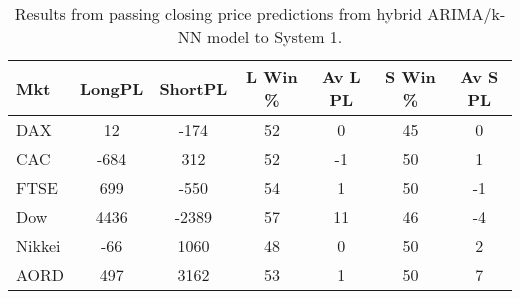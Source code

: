 \begin{table}[ht]
\centering
\caption[Results from passing closing price predictions from hybrid ARIMA/k-NN model to System 1]{Results from passing closing price predictions from hybrid ARIMA/k-NN model to System 1.} 
\label{tab:chp_ts:pred_close_arima_knn_sys1}
\begin{tabular}{lcccccc}
  \toprule Mkt & LongPL & ShortPL & L Win \% & Av L PL & S Win \% & Av S PL \\ 
  \midrule DAX & 12 & -174 & 52 & 0 & 45 & 0 \\ 
  CAC & -684 & 312 & 52 & -1 & 50 & 1 \\ 
  FTSE & 699 & -550 & 54 & 1 & 50 & -1 \\ 
  Dow & 4436 & -2389 & 57 & 11 & 46 & -4 \\ 
  Nikkei & -66 & 1060 & 48 & 0 & 50 & 2 \\ 
  AORD & 497 & 3162 & 53 & 1 & 50 & 7 \\ 
   \bottomrule \end{tabular}
\end{table}
